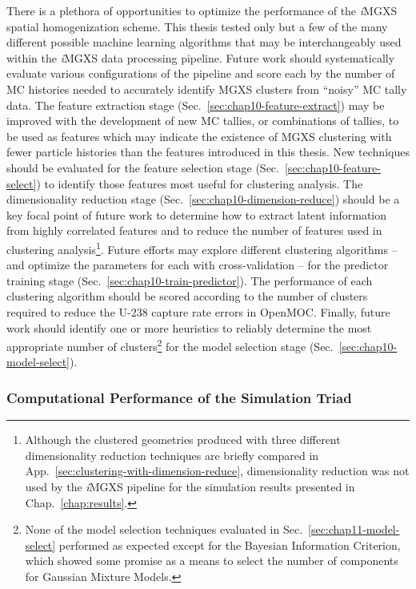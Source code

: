 There is a plethora of opportunities to optimize the performance of the \textit{i}\ac{MGXS} spatial homogenization scheme. This thesis tested only but a few of the many different possible machine learning algorithms that may be interchangeably used within the \textit{i}\ac{MGXS} data processing pipeline. Future work should systematically evaluate various configurations of the pipeline and score each by the number of \ac{MC} histories needed to accurately identify \ac{MGXS} clusters from ``noisy'' \ac{MC} tally data. The feature extraction stage (Sec.~\ref{sec:chap10-feature-extract}) may be improved with the development of new \ac{MC} tallies, or combinations of tallies, to be used as features which may indicate the existence of \ac{MGXS} clustering with fewer particle histories than the features introduced in this thesis. New techniques should be evaluated for the feature selection stage (Sec.~\ref{sec:chap10-feature-select}) to identify those features most useful for clustering analysis. The dimensionality reduction stage (Sec.~\ref{sec:chap10-dimension-reduce}) should be a key focal point of future work to determine how to extract latent information from highly correlated features and to reduce the number of features used in clustering analysis\footnote{Although the clustered geometries produced with three different dimensionality reduction techniques are briefly compared in App.~\ref{sec:clustering-with-dimension-reduce}, dimensionality reduction was not used by the \textit{i}\ac{MGXS} pipeline for the simulation results presented in Chap.~\ref{chap:results}.}. Future efforts may explore different clustering algorithms -- and optimize the parameters for each with cross-validation -- for the predictor training stage (Sec.~\ref{sec:chap10-train-predictor}). The performance of each clustering algorithm should be scored according to the number of clusters required to reduce the U-238 capture rate errors in OpenMOC. Finally, future work should identify one or more heuristics to reliably determine the most appropriate number of clusters\footnote{None of the model selection techniques evaluated in Sec.~\ref{sec:chap11-model-select} performed as expected except for the Bayesian Information Criterion, which showed some promise as a means to select the number of components for Gaussian Mixture Models.} for the model selection stage (Sec.~\ref{sec:chap10-model-select}).

\subsubsection{Computational Performance of the Simulation Triad}
\label{subsubsec:chap12-optimize-simulation-triad}

